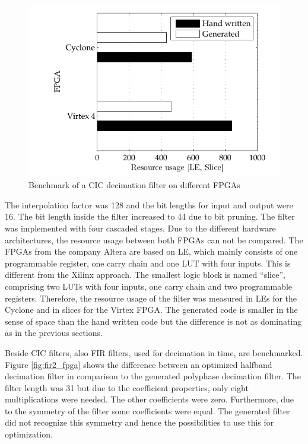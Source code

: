 \begin{figure}[htb]
	\centering
		\includegraphics{../kapitel02/figures/cic_fpga.pdf}
	\caption{Benchmark of a CIC decimation filter on different FPGAs}
	\label{fig:cic_fpga}
\end{figure}

The interpolation factor was 128 and the bit lengths for input and output were 16. The bit length inside the filter increased to 44 due to bit pruning. The filter was implemented with four cascaded stages. Due to the different hardware architectures, the resource usage between both FPGAs can not be compared. The FPGAs from the company Altera are based on \ac{LE}, which mainly consists of one programmable register, one carry chain and one \ac{LUT} with four inputs. This is different from the Xilinx approach. The smallest logic block is named ``slice'', comprising two \acp{LUT} with four inputs, one carry chain and two programmable registers. Therefore, the resource usage of the filter was measured in \acp{LE} for the Cyclone and in slices for the Virtex FPGA. The generated code is smaller in the sense of space than the hand written code but the difference is not as dominating as in the previous sections.


Beside \ac{CIC} filters, also \ac{FIR} filters, used for decimation in time, are benchmarked. Figure \ref{fig:fir2_fpga} shows the difference between an optimized halfband decimation filter in comparison to the generated polyphase decimation filter. The filter length was 31 but due to the coefficient properties, only eight multiplications were needed. The other coefficients were zero. Furthermore, due to the symmetry of the filter some coefficients were equal. The generated filter did not recognize this symmetry and hence the possibilities to use this for optimization.

